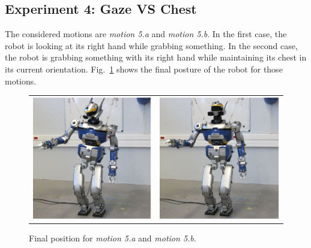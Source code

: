 \documentclass[journal]{IEEEtran}
\begin{document}
\subsection{Experiment 4: Gaze VS Chest}
The considered motions are \emph{motion 5.a} and \emph{motion 5.b}.
In the first case, the robot is looking at its right hand while grabbing something.
In the second case, the robot is grabbing something with its right hand while
maintaining its chest in its current orientation. Fig.~\ref{fig:motion5}
shows the final posture of the robot for those motions.
\setcounter{figure}{15}
\begin{figure}[t]
  \centering
  \begin{tabular}{cc}
    \includegraphics[width=0.4\linewidth]{img/realRobot/5a/5aFinal1.ps} &
    \includegraphics[width=0.4\linewidth]{img/realRobot/5b/5bFinal1.ps} \\
  \end{tabular}
  \caption{Final position for \emph{motion 5.a} and \emph{motion 5.b}.}
  \label{fig:motion5}
\end{figure}
\end{document}
